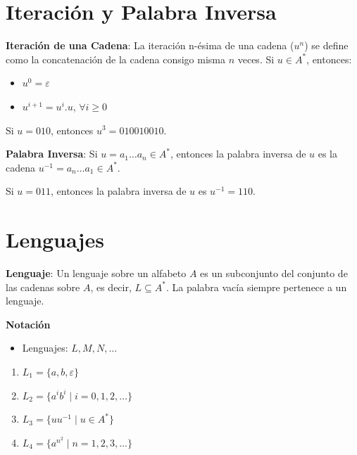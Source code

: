 \documentclass[12pt]{report} %
\begin{document}
\hypertarget{iteraciuxf3n-y-palabra-inversa}{%
\section{Iteración y Palabra
Inversa}\label{iteraciuxf3n-y-palabra-inversa}}

\begin{definicion}
\textbf{Iteración de una Cadena}: La iteración n-ésima de una cadena ($u^n$) se define como la concatenación de la cadena consigo misma $n$ veces.  
Si $u \in A^*$, entonces:  
\begin{itemize}
    \item $u^0 = \varepsilon$  
    \item $u^{i+1} = u^i.u$, $\forall i \geq 0$  
\end{itemize}
\end{definicion}

\begin{ejemplo}
Si $u = 010$, entonces $u^3 = 010010010$.
\end{ejemplo}

\begin{definicion}
\textbf{Palabra Inversa}: Si $u = a_1 \ldots a_n \in A^*$, entonces la palabra inversa de $u$ es la cadena $u^{-1} = a_n \ldots a_1 \in A^*$.  
\end{definicion}

\begin{ejemplo}
Si $u = 011$, entonces la palabra inversa de $u$ es $u^{-1} = 110$.
\end{ejemplo}

\hypertarget{lenguajes}{%
\section{Lenguajes}\label{lenguajes}}

\begin{definicion}
\textbf{Lenguaje}: Un lenguaje sobre un alfabeto $A$ es un subconjunto del conjunto de las cadenas sobre $A$, es decir, $L \subseteq A^*$.  
La palabra vacía siempre pertenece a un lenguaje.
\end{definicion}

\textbf{Notación}\\

\begin{itemize}
    \item Lenguajes: $L, M, N, \ldots$
\end{itemize}

\begin{ejemplo}
    \begin{enumerate}
        \item $L_1 = \{a, b, \varepsilon\}$  
        \item $L_2 = \{a^i b^i \mid i = 0, 1, 2, \ldots\}$  
        \item $L_3 = \{u u^{-1} \mid u \in A^*\}$  
        \item $L_4 = \{a^{n^2} \mid n = 1, 2, 3, \ldots\}$  
    \end{enumerate}
\end{ejemplo}
\end{document}
